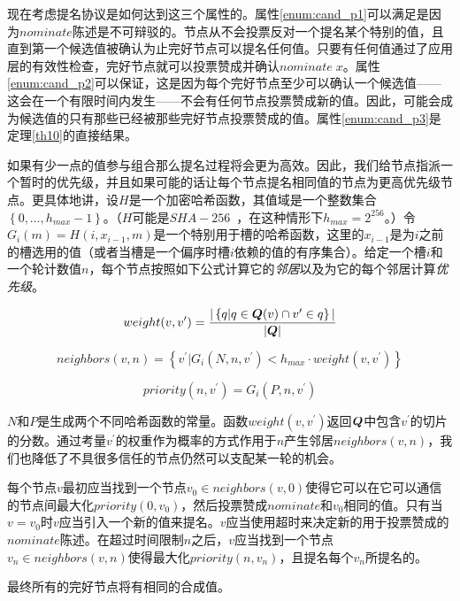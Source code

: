 现在考虑提名协议是如何达到这三个属性的。属性\ref{enum:cand_p1}可以满足是因为$nominate$陈述是不可辩驳的。节点从不会投票反对一个提名某个特别的值，且直到第一个候选值被确认为止完好节点可以提名任何值。只要有任何值通过了应用层的有效性检查，完好节点就可以投票赞成并确认$nominate\;x$。属性\ref{enum:cand_p2}可以保证，这是因为每个完好节点至少可以确认一个候选值——这会在一个有限时间内发生——不会有任何节点投票赞成新的值。因此，可能会成为候选值的只有那些已经被那些完好节点投票赞成的值。属性\ref{enum:cand_p3}是定理\ref{th10}的直接结果。

如果有少一点的值参与组合那么提名过程将会更为高效。因此，我们给节点指派一个暂时的优先级，并且如果可能的话让每个节点提名相同值的节点为更高优先级节点。更具体地讲，设$H$是一个加密哈希函数，其值域是一个整数集合$\left\{0,\dots,h_{max}-1\right\}$。（$H$可能是$SHA-256$~\cite{shs2015}，在这种情形下$h_{max}=2^{256}$。）令$G_i(m)=H(i, x_{i-1},m)$是一个特别用于槽的哈希函数，这里的$x_{i-1}$是为$i$之前的槽选用的值（或者当槽是一个偏序时槽$i$依赖的值的有序集合）。给定一个槽$i$和一个轮计数值$n$，每个节点按照如下公式计算它的\textit{邻居}以及为它的每个邻居计算\textit{优先级}。

\begin{equation*}
	weight(v,v^{\prime}) = \frac{|\left\{q|q\in{\bm Q}(v)\cap v^{\prime}\in q\right\}|}{|{\bm Q}|}
\end{equation*}

\begin{equation*}
	neighbors(v,n) = \left\{v^{\prime}|G_i(N,n,v^{\prime})<h_{max}\cdot weight(v,v^{\prime})\right\}
\end{equation*}

\begin{equation*}
	priority(n,v^{\prime}) = G_i(P,n,v^{\prime})
\end{equation*}

$N$和$P$是生成两个不同哈希函数的常量。函数$weight(v,v^{\prime})$返回${\bm Q}$中包含$v^{\prime}$的切片的分数。通过考量$v^{\prime}$的权重作为概率的方式作用于$n$产生邻居$neighbors(v,n)$，我们也降低了不具很多信任的节点仍然可以支配某一轮的机会。

每个节点$v$最初应当找到一个节点$v_0\in neighbors(v,0)$使得它可以在它可以通信的节点间最大化$priority(0,v_0)$，然后投票赞成$nominate$和$v_0$相同的值。只有当$v=v_0$时$v$应当引入一个新的值来提名。$v$应当使用超时来决定新的用于投票赞成的$nominate$陈述。在超过时间限制$n$之后，$v$应当找到一个节点$v_n\in neighbors(v,n)$使得最大化$priority(n,v_n)$，且提名每个$v_n$所提名的。

\begin{theorem}\label{th11}
	最终所有的完好节点将有相同的合成值。
\end{theorem}

